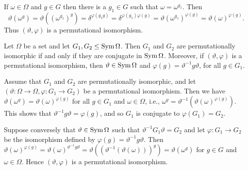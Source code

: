 \begin{sketch}
	If $\omega \in \Omega $ and $g \in G $ then there is a $g_1 \in G $ such that $\omega = \omega^{g_1}$. Then
	\begin{equation*}
		\vartheta(\omega^g) = \vartheta((\omega^{g_1} )^g) = \delta^{\varphi(g_1g)} = \delta^{\varphi(g_1)\varphi(g)} = \vartheta(\omega^{g_1} )^{\varphi(g)} = \vartheta(\omega)^{\varphi(g)}.
	\end{equation*}
	Thus $(\vartheta, \varphi)$ is a permutational isomorphism.
\end{sketch}




\begin{proposition}
	Let $\Omega$ be a set and let $G_1, G_2 \le \operatorname{Sym}\Omega$. Then $G_1$ and $G_2$ are permutationally isomorphic if and only if they are conjugate in $\operatorname{Sym}\Omega$. Moreover, if $(\vartheta, \varphi)$ is a permutational isomorphism, then $\vartheta \in \operatorname{Sym}\Omega$ and $\varphi(g) = \vartheta^{-1}g\vartheta$, for all $g \in G_1$.
\end{proposition}

\begin{sketch}
	Assume that $G_1$ and $G_2$ are permutationally isomorphic, and let $(\vartheta:\Omega\to \Omega, \varphi:G_1\rightarrow G_2)$ be a permutational isomorphism. Then we have $\vartheta(\omega^g) = \vartheta(\omega)^{\varphi(g)}$ for all $g \in G_1$ and $\omega \in \Omega$, i.e., $\omega^g = \vartheta^{-1}(\vartheta(\omega)^{\varphi(g)})$. This shows that $\vartheta^{-1}g\vartheta = \varphi(g)$, and so $G_1$ is conjugate to $\varphi(G_1) = G_2$.
	
	Suppose conversely that $\vartheta \in \operatorname{Sym}\Omega$ such that $\vartheta^{-1}G_1\vartheta = G_2$ and let $\varphi: G_1 \to G_2$ be the isomorphism defined by  $\varphi(g) = \vartheta^{-1}g\vartheta$. Then  $\vartheta(\omega)^{\varphi(g)} = \vartheta(\omega)^{\vartheta^{-1}g\vartheta} = \vartheta((\vartheta^{-1}(\vartheta(\omega)))^{g}) = \vartheta(\omega^g)$ for $g \in G$ and $\omega \in \Omega$. Hence $(\vartheta, \varphi)$ is a permutational isomorphism.
\end{sketch}

